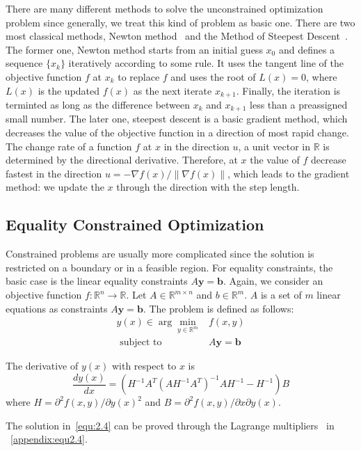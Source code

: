 \par There are many different methods to solve the unconstrained optimization problem since generally, we treat this kind of problem as basic one. There are two most classical methods, Newton method~\citep{NT:36} and the Method of Steepest Descent~\citep{DP:09}. The former one, Newton method starts from an initial guess $x_0$ and defines a sequence $\{x_k\}$
iteratively according to some rule. It uses the tangent line of the objective function $f$ at $x_k$ to replace $f$ and uses the root of $L(x) = 0$, where $L(x)$ is the updated $f(x)$ as the next iterate $x_{k+1}$. Finally, the iteration is terminted as long as the difference between $x_k$ and $x_{k+1}$ less than a preassigned small number. The later one, steepest descent is a basic gradient method, which decreases the value of the objective function in a direction of most rapid change. The change rate of a function $f$ at $x$ in the direction $u$, a unit vector in $\mathbb{R}$ is determined by the directional derivative. Therefore, at $x$ the value of $f$ decrease fastest in the direction $u=-\nabla f(x)/\|\nabla f(x)\|$, which leads to the gradient method: we update the $x$ through the direction with the step length. 


\subsection{Equality Constrained Optimization}
Constrained problems are usually more complicated since the solution is restricted on a boundary or in a feasible region. For equality constraints, the basic case is the linear equality constraints $A \boldsymbol{y} = \boldsymbol{b}$. Again, we consider an objective function $f: \mathbb{R}^{n} \rightarrow \mathbb{R}$. Let $A \in \mathbb{R}^{m \times n}$ and $b \in \mathbb{R}^{m}$. $A$ is a set of $m$ linear equations as constraints $A \boldsymbol{y} = \boldsymbol{b}$. The problem is defined as follows:
$$
\begin{array}{rl}y(x) \in \arg \min _{y \in \mathbb{R}^{m}} & f(x, y) \\ \textrm { subject to } & A \boldsymbol{y}=\boldsymbol{b}\end{array}
$$
\par The derivative of $y(x)$ with respect to $x$ is
\begin{equation}
    \label{equ:2.4}
    \frac{dy(x)}{dx} = \left(H^{-1} A^{T}\left(A H^{-1} A^{T}\right)^{-1} A H^{-1}-H^{-1}\right) B
\end{equation}
where $H = \partial^{2} f(x, y) / \partial y(x)^2$ and $B = \partial^{2} f(x, y) / \partial x \partial y(x)$. 
\par The solution in~\ref{equ:2.4} can be proved through the Lagrange multipliers~\citep{BD:14} in ~\ref{appendix:equ2.4}. 



